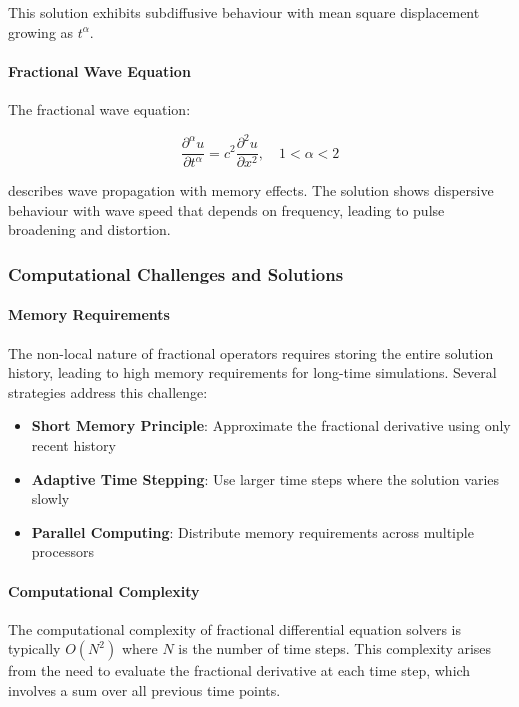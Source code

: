 This solution exhibits subdiffusive behaviour with mean square displacement growing as $t^{\alpha}$.

\paragraph{Fractional Wave Equation}

The fractional wave equation:

\begin{equation}
\frac{\partial^{\alpha} u}{\partial t^{\alpha}} = c^2 \frac{\partial^2 u}{\partial x^2}, \quad 1 < \alpha < 2
\end{equation}

describes wave propagation with memory effects. The solution shows dispersive behaviour with wave speed that depends on frequency, leading to pulse broadening and distortion.

\subsubsection{Computational Challenges and Solutions}

\paragraph{Memory Requirements}

The non-local nature of fractional operators requires storing the entire solution history, leading to high memory requirements for long-time simulations. Several strategies address this challenge:

\begin{itemize}
    \item \textbf{Short Memory Principle}: Approximate the fractional derivative using only recent history
    \item \textbf{Adaptive Time Stepping}: Use larger time steps where the solution varies slowly
    \item \textbf{Parallel Computing}: Distribute memory requirements across multiple processors
\end{itemize}

\paragraph{Computational Complexity}

The computational complexity of fractional differential equation solvers is typically $O(N^2)$ where $N$ is the number of time steps. This complexity arises from the need to evaluate the fractional derivative at each time step, which involves a sum over all previous time points.

